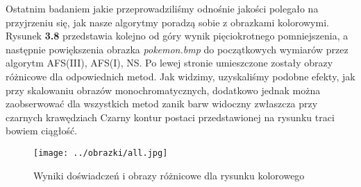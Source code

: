 Ostatnim badaniem jakie przeprowadziliśmy odnośnie jakości polegało na przyjrzeniu się,
jak nasze algorytmy poradzą sobie z obrazkami kolorowymi. Rysunek \textbf{3.8}
przedstawia kolejno od góry wynik pięciokrotnego pomniejszenia, a następnie
powiększenia obrazka \textit{pokemon.bmp} do początkowych wymiarów przez algorytm AFS(III), 
AFS(I), NS. Po lewej stronie umieszczone zostały obrazy różnicowe dla odpowiednich metod. Jak widzimy, uzyskaliśmy podobne efekty,
jak przy skalowaniu obrazów monochromatycznych, dodatkowo jednak można zaobserwować
dla wszystkich metod zanik barw widoczny zwłaszcza przy czarnych krawędziach
Czarny kontur postaci przedstawionej na rysunku traci bowiem ciągłość.
\begin{figure}[h!tb]
\begin{center}
\texttt{[image: ../obrazki/all.jpg]}
\caption{Wyniki doświadczeń i obrazy różnicowe dla rysunku kolorowego}
\end{center}
\end{figure}







